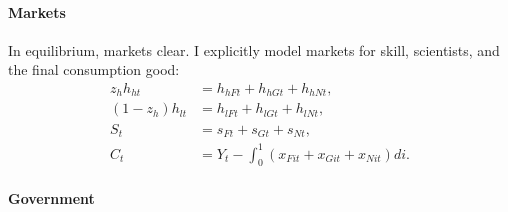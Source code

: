 



  
\paragraph{Markets}
In equilibrium, markets clear. I explicitly model markets for skill, scientists, and the final consumption good:
\begin{align*}
z_h h_{ht}&=h_{hFt}+h_{hGt}+h_{hNt},\\
(1-z_h) h_{lt}&=h_{lFt}+h_{lGt}+h_{lNt},\\
S_t&=s_{Ft}+s_{Gt}+s_{Nt},\\
C_t&=Y_t-\int_{0}^{1}\left(x_{Fit}+x_{Git}+x_{Nit}\right)di.  %
\end{align*}

\paragraph{Government}


